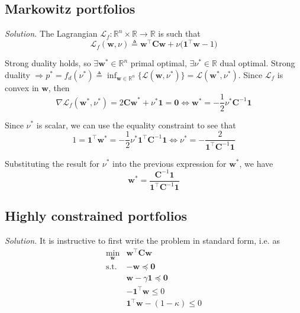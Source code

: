 \documentclass{article}
\numberwithin{equation}{section}
\begin{document}
\subsection{Markowitz portfolios}

\textit{Solution.} The Lagrangian $ \mathcal{L}_f : \mathbb{R}^n \times \mathbb{R} \rightarrow \mathbb{R} $ is such that
\begin{equation*}
    \mathcal{L}_f(\mathbf{w}, \nu) \triangleq \mathbf{w}^\top\mathbf{Cw} +
    \nu\big(\mathbf{1}^\top\mathbf{w} - 1\big)
\end{equation*}

Strong duality holds, so $ \exists \mathbf{w}^* \in \mathbb{R}^n $ primal
optimal, $ \exists \nu^* \in \mathbb{R} $ dual optimal. Strong duality
$ \Rightarrow p^* = f_d(\nu^*) \triangleq \inf_{\mathbf{w} \in \mathbb{R}^n}
\{\mathcal{L}(\mathbf{w}, \nu^*)\} = \mathcal{L}(\mathbf{w}^*, \nu^*) $.
Since $ \mathcal{L}_f $ is convex in $ \mathbf{w} $, then
\begin{equation*}
    \nabla\mathcal{L}_f(\mathbf{w}^*, \nu^*) = 2\mathbf{Cw}^* +
    \nu^*\mathbf{1} = \mathbf{0} \Leftrightarrow
    \mathbf{w}^* = -\frac{1}{2}\nu^*\mathbf{C}^{-1}\mathbf{1}
\end{equation*}

Since $ \nu^* $ is scalar, we can use the equality constraint to see that
\begin{equation*}
    1 = \mathbf{1}^\top\mathbf{w}^* =
    -\frac{1}{2}\nu^*\mathbf{1}^\top\mathbf{C}^{-1}\mathbf{1} \Leftrightarrow
    \nu^* = -\frac{2}{\mathbf{1}^\top\mathbf{C}^{-1}\mathbf{1}}
\end{equation*}

Substituting the result for $ \nu^* $ into the previous expression for
$ \mathbf{w}^* $, we have
\begin{equation*}
    \mathbf{w}^* = \frac{
        \mathbf{C}^{-1}\mathbf{1}
    }{
        \mathbf{1}^\top\mathbf{C}^{-1}\mathbf{1}
    }
\end{equation*}

\subsection{Highly constrained portfolios}

\textit{Solution.} It is instructive to first write the problem in standard
form, i.e. as
\begin{equation*}
    \begin{array}{ll}
        \displaystyle\min_\mathbf{w} & \mathbf{w}^\top\mathbf{Cw} \\
        \text{s.t.} & -\mathbf{w} \preceq \mathbf{0} \\
            & \mathbf{w} - \gamma\mathbf{1} \preceq \mathbf{0} \\
            & -\mathbf{1}^\top\mathbf{w} \le 0 \\
            & \mathbf{1}^\top\mathbf{w} - (1 - \kappa) \le 0
    \end{array}
\end{equation*}
\end{document}
